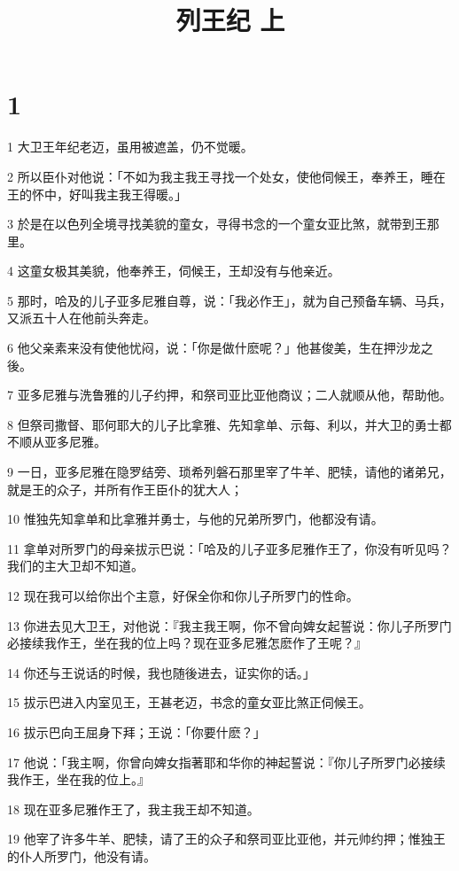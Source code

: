 

\title{列王纪 上}


\chapter{1}

\par 1 大卫王年纪老迈，虽用被遮盖，仍不觉暖。
\par 2 所以臣仆对他说：「不如为我主我王寻找一个处女，使他伺候王，奉养王，睡在王的怀中，好叫我主我王得暖。」
\par 3 於是在以色列全境寻找美貌的童女，寻得书念的一个童女亚比煞，就带到王那里。
\par 4 这童女极其美貌，他奉养王，伺候王，王却没有与他亲近。
\par 5 那时，哈及的儿子亚多尼雅自尊，说：「我必作王」，就为自己预备车辆、马兵，又派五十人在他前头奔走。
\par 6 他父亲素来没有使他忧闷，说：「你是做什麽呢？」他甚俊美，生在押沙龙之後。
\par 7 亚多尼雅与洗鲁雅的儿子约押，和祭司亚比亚他商议；二人就顺从他，帮助他。
\par 8 但祭司撒督、耶何耶大的儿子比拿雅、先知拿单、示每、利以，并大卫的勇士都不顺从亚多尼雅。
\par 9 一日，亚多尼雅在隐罗结旁、琐希列磐石那里宰了牛羊、肥犊，请他的诸弟兄，就是王的众子，并所有作王臣仆的犹大人；
\par 10 惟独先知拿单和比拿雅并勇士，与他的兄弟所罗门，他都没有请。
\par 11 拿单对所罗门的母亲拔示巴说：「哈及的儿子亚多尼雅作王了，你没有听见吗？我们的主大卫却不知道。
\par 12 现在我可以给你出个主意，好保全你和你儿子所罗门的性命。
\par 13 你进去见大卫王，对他说：『我主我王啊，你不曾向婢女起誓说：你儿子所罗门必接续我作王，坐在我的位上吗？现在亚多尼雅怎麽作了王呢？』
\par 14 你还与王说话的时候，我也随後进去，证实你的话。」
\par 15 拔示巴进入内室见王，王甚老迈，书念的童女亚比煞正伺候王。
\par 16 拔示巴向王屈身下拜；王说：「你要什麽？」
\par 17 他说：「我主啊，你曾向婢女指著耶和华你的神起誓说：『你儿子所罗门必接续我作王，坐在我的位上。』
\par 18 现在亚多尼雅作王了，我主我王却不知道。
\par 19 他宰了许多牛羊、肥犊，请了王的众子和祭司亚比亚他，并元帅约押；惟独王的仆人所罗门，他没有请。
